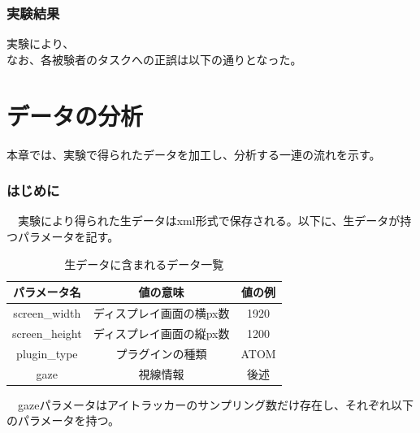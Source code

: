 \documentclass[paper=a4paper,fontsize=11pt]{jlreq}
\begin{document}
  \section{実験結果}
    実験により、\\
    なお、各被験者のタスクへの正誤は以下の通りとなった。\\


\clearpage

\part{データの分析}
  本章では、実験で得られたデータを加工し、分析する一連の流れを示す。

  \section{はじめに}
  　実験により得られた生データはxml形式で保存される。以下に、生データが持つパラメータを記す。\\
    \begin{table}[h]
      \centering
      \caption{生データに含まれるデータ一覧}
      \begin{tabular}{|c|c|c|}
        \hline
        パラメータ名 & 値の意味 & 値の例 \\ \hline
        screen\_width & ディスプレイ画面の横px数 & 1920 \\ \hline
        screen\_height & ディスプレイ画面の縦px数 & 1200 \\ \hline
        plugin\_type & プラグインの種類 & ATOM \\ \hline
        gaze & 視線情報 & 後述 \\ \hline
      \end{tabular}
      \label{tab:basic}
    \end{table}
   \FloatBarrier

  　gazeパラメータはアイトラッカーのサンプリング数だけ存在し、それぞれ以下のパラメータを持つ。
\end{document}
